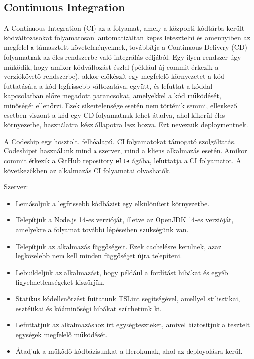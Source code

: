 \documentclass{elteikthesis}
\begin{document}
			\subsection{Continuous Integration}
				A Continuous Integration (CI) \cite{ci} az a folyamat, amely a központi kódtárba került kódváltozásokat folyamatosan, automatizáltan képes letesztelni és amennyiben az megfelel a támasztott követelményeknek, továbbítja a Continuous Delivery (CD) folyamatnak az éles rendszerbe való integrálás céljából. Egy ilyen rendszer úgy működik, hogy amikor kódváltozást észlel (például új commit érkezik a verziókövető rendszerbe), akkor előkészít egy megfelelő környezetet a kód futtatására a kód legfrissebb változatával együtt, és lefuttat a kóddal kapcsolatban előre megadott parancsokat, amelyekkel a kód működését, minőségét ellenőrzi. Ezek sikertelensége esetén nem történik semmi, ellenkező esetben viszont a kód egy CD folyamatnak lehet átadva, ahol kikerül éles környezetbe, használatra kész állapotra lesz hozva. Ezt nevezzük deploymentnek.

				A Codeship \cite{codeship} egy hosztolt, felhőalapú, CI folyamatokat támogató szolgáltatás. Codeshipet használunk mind a szerver, mind a kliens alkalmazás esetén. Amikor commit érkezik a GitHub repository \texttt{elte} ágába, lefuttatja a CI folyamatot. A következőkben az alkalmazás CI folyamatai olvashatók.

				Szerver:
				\begin{itemize}
					\setlength\itemsep{-0.5em}
					\item Lemásoljuk a legfrissebb kódbázist egy elkülönített környezetbe.
					\item Telepítjük a Node.js 14-es verzióját, illetve az OpenJDK 14-es verzióját, amelyekre a folyamat további lépéseiben szükségünk van.
					\item Telepítjük az alkalmazás függőségeit. Ezek cachelésre kerülnek, azaz legközelebb nem kell minden függőséget újra telepíteni.
					\item Lebuildeljük az alkalmazást, hogy például a fordítást hibákat és egyéb figyelmetlenségeket kiszűrjük.
					\item Statikus kódellenőrzést futtatunk TSLint segítségével, amellyel stilisztikai, esztétikai és kódminőségi hibákat szűrhetünk ki.
					\item Lefuttatjuk az alkalmazáshoz írt egységteszteket, amivel biztosítjuk a tesztelt egységek megfelelő működését.
					\item Átadjuk a működő kódbázisunkat a Herokunak, ahol az deployolásra kerül.
				\end{itemize}
\end{document}
